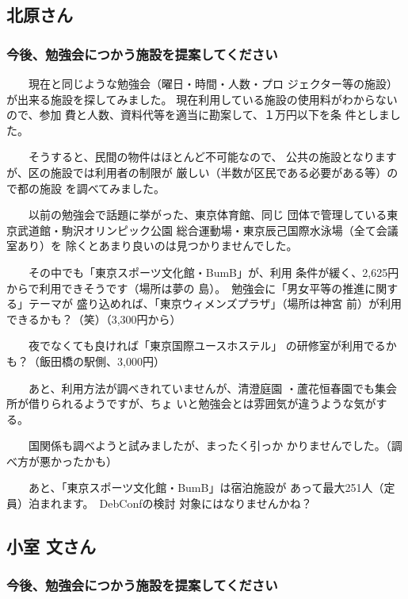 \documentclass[mingoth,a4paper,twoside]{jsarticle}
\begin{document}
\subsection{北原さん}


\subsubsection{今後、勉強会につかう施設を提案してください}

　　現在と同じような勉強会（曜日・時間・人数・プロ
ジェクター等の施設）が出来る施設を探してみました。
現在利用している施設の使用料がわからないので、参加
費と人数、資料代等を適当に勘案して、１万円以下を条
件としました。

　　そうすると、民間の物件はほとんど不可能なので、
公共の施設となりますが、区の施設では利用者の制限が
厳しい（半数が区民である必要がある等）ので都の施設
を調べてみました。

　　以前の勉強会で話題に挙がった、東京体育館、同じ
団体で管理している東京武道館・駒沢オリンピック公園
総合運動場・東京辰己国際水泳場（全て会議室あり）を
除くとあまり良いのは見つかりませんでした。

　　その中でも「東京スポーツ文化館・BumB」が、利用
条件が緩く、2,625円からで利用できそうです（場所は夢の
島）。　勉強会に「男女平等の推進に関する」テーマが
盛り込めれば、「東京ウィメンズプラザ」（場所は神宮
前）が利用できるかも？（笑）（3,300円から）

　　夜でなくても良ければ「東京国際ユースホステル」
の研修室が利用でるかも？（飯田橋の駅側、3,000円）

　　あと、利用方法が調べきれていませんが、清澄庭園
・蘆花恒春園でも集会所が借りられるようですが、ちょ
いと勉強会とは雰囲気が違うような気がする。

　　国関係も調べようと試みましたが、まったく引っか
かりませんでした。（調べ方が悪かったかも）

　　あと、「東京スポーツ文化館・BumB」は宿泊施設が
あって最大251人（定員）泊まれます。　DebConfの検討
対象にはなりませんかね？



\subsection{小室 文さん}

\subsubsection{今後、勉強会につかう施設を提案してください}
\end{document}
